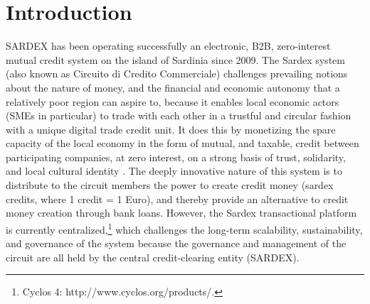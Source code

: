\chapter{Introduction}
\label{ch:Introduction}


SARDEX has been operating successfully an electronic, B2B, zero-interest mutual credit system on the island of Sardinia since 2009. The Sardex system (also known as Circuito di Credito Commerciale) challenges prevailing notions about the nature of money, and the financial and economic autonomy that a relatively poor region can aspire to, because it enables local economic actors (SMEs in particular) to trade with each other in a trustful and circular fashion with a unique digital trade credit unit. It does this by monetizing the spare capacity of the local economy in the form of mutual, and taxable, credit between participating companies, at zero interest, on a strong basis of trust, solidarity, and local cultural identity \cite{DiniMottaSartori2016,SartoriDini2016}. The deeply innovative nature of this system is to distribute to the circuit members the power to create credit money (sardex credits, where 1 credit = 1 Euro), and thereby provide an alternative to credit money creation through bank loans. However, the Sardex transactional platform is currently centralized,\footnote{Cyclos 4: http://www.cyclos.org/products/.} which challenges the long-term scalability, sustainability, and governance of the system because the governance and management of the circuit are all held by the central credit-clearing entity (SARDEX).







